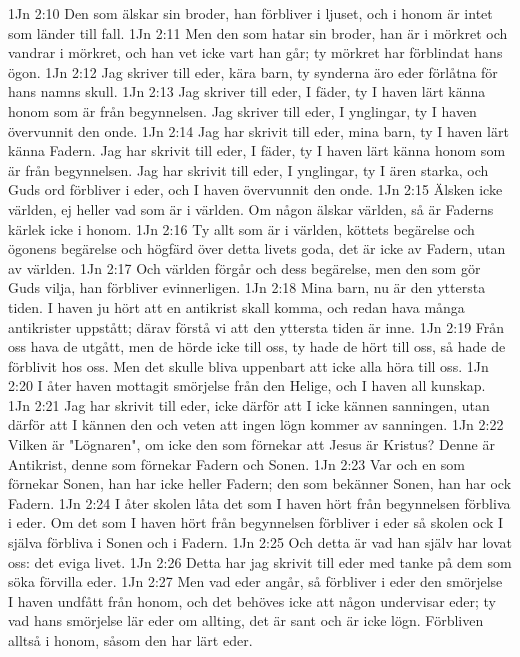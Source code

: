 1Jn 2:10  Den som älskar sin broder, han förbliver i ljuset, och i honom är intet som länder till fall.
1Jn 2:11  Men den som hatar sin broder, han är i mörkret och vandrar i mörkret, och han vet icke vart han går; ty mörkret har förblindat hans ögon.
1Jn 2:12  Jag skriver till eder, kära barn, ty synderna äro eder förlåtna för hans namns skull.
1Jn 2:13  Jag skriver till eder, I fäder, ty I haven lärt känna honom som är från begynnelsen. Jag skriver till eder, I ynglingar, ty I haven övervunnit den onde.
1Jn 2:14  Jag har skrivit till eder, mina barn, ty I haven lärt känna Fadern. Jag har skrivit till eder, I fäder, ty I haven lärt känna honom som är från begynnelsen. Jag har skrivit till eder, I ynglingar, ty I ären starka, och Guds ord förbliver i eder, och I haven övervunnit den onde.
1Jn 2:15  Älsken icke världen, ej heller vad som är i världen. Om någon älskar världen, så är Faderns kärlek icke i honom.
1Jn 2:16  Ty allt som är i världen, köttets begärelse och ögonens begärelse och högfärd över detta livets goda, det är icke av Fadern, utan av världen.
1Jn 2:17  Och världen förgår och dess begärelse, men den som gör Guds vilja, han förbliver evinnerligen.
1Jn 2:18  Mina barn, nu är den yttersta tiden. I haven ju hört att en antikrist skall komma, och redan hava många antikrister uppstått; därav förstå vi att den yttersta tiden är inne.
1Jn 2:19  Från oss hava de utgått, men de hörde icke till oss, ty hade de hört till oss, så hade de förblivit hos oss. Men det skulle bliva uppenbart att icke alla höra till oss.
1Jn 2:20  I åter haven mottagit smörjelse från den Helige, och I haven all kunskap.
1Jn 2:21  Jag har skrivit till eder, icke därför att I icke kännen sanningen, utan därför att I kännen den och veten att ingen lögn kommer av sanningen.
1Jn 2:22  Vilken är "Lögnaren", om icke den som förnekar att Jesus är Kristus? Denne är Antikrist, denne som förnekar Fadern och Sonen.
1Jn 2:23  Var och en som förnekar Sonen, han har icke heller Fadern; den som bekänner Sonen, han har ock Fadern.
1Jn 2:24  I åter skolen låta det som I haven hört från begynnelsen förbliva i eder. Om det som I haven hört från begynnelsen förbliver i eder så skolen ock I själva förbliva i Sonen och i Fadern.
1Jn 2:25  Och detta är vad han själv har lovat oss: det eviga livet.
1Jn 2:26  Detta har jag skrivit till eder med tanke på dem som söka förvilla eder.
1Jn 2:27  Men vad eder angår, så förbliver i eder den smörjelse I haven undfått från honom, och det behöves icke att någon undervisar eder; ty vad hans smörjelse lär eder om allting, det är sant och är icke lögn. Förbliven alltså i honom, såsom den har lärt eder.
